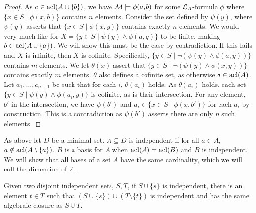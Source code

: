 \begin{proof}
As \(a \in \text{acl}(A \cup \{b\})\), we have \(\mathcal{M} \models \phi(a, b)\) for some \(\mathcal{L}_A\)-formula 
\(\phi\) where \(\{x \in S \mid \phi(x, b)\}\) contains \(n\) elements. 
Consider the set defined by \(\psi(y)\), where \(\psi(y)\) asserts that \(\{x \in S \mid \phi(x, y)\}\) contains exactly \(n\) elements. %
We would very much like for \(X = \{y \in S \mid \psi(y) \land \phi(a, y)\}\) to be finite, making \(b \in \text{acl}(A \cup \{a\})\). 
We will show this must be the case by contradiction.
If this fails and \(X\) is infinite, then \(X\) is cofinite. 
Specifically, \(\{y \in S \mid \neg(\psi(y) \land \phi(a, y))\}\) contains \(m\) elements.  
We let \(\theta(x)\) assert that \(\{y \in S \mid \neg(\psi(y) \land \phi(x, y))\}\) contains exactly \(m\) elements.
\(\theta\) also defines a cofinite set, as otherwise \(a \in \text{acl}(A)\).   
Let \(a_1, \ldots, a_{n+1}\) be such that for each \(i\), \(\theta(a_i)\) holds.
As \(\theta(a_i)\) holds, each set \(\{y \in S \mid \psi(y) \land \phi(a_i, y)\}\) is cofinite, as is their intersection. 
For any element, \(b'\) in the intersection, we have \(\psi(b')\) and \(a_i \in \{x \in S \mid \phi(x, b')\}\) for each \(a_i\) by construction.
This is a contradiction as \(\psi(b')\) asserts there are only \(n\) such elements.  
\end{proof}

\begin{definition}\label{definition_independence}
As above let \(D\) be a minimal set. \(A \subseteq D\) is independent if for all \(a \in A\), \(a \notin \text{acl}(A \setminus \{a\})\). 
\(B\) is a basis for \(A\) when \(\text{acl}(A) = \text{acl}(B)\) and \(B\) is independent.
We will show that all bases of a set \(A\)  have the same cardinality, which we will call the dimension of \(A\).
\end{definition}

\begin{lemma}\label{lemma_dimension}
Given two disjoint independent sets, \(S, T\), %
 if \(S \cup \{s\}\) is independent, there is an element \(t \in T\) such that \((S \cup \{s\}) \cup (T \setminus \{t\})\) is independent and has the same algebraic closure as \(S \cup T\). 
\end{lemma}

